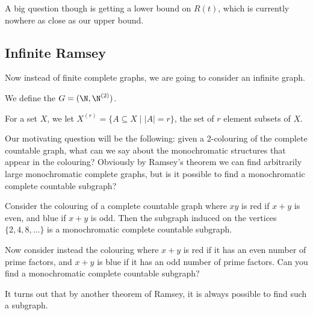 \documentclass[a4paper]{scrartcl}
\begin{document}
A big question though is getting a lower bound on $R(t)$, which is currently nowhere as close as our upper bound.


\subsection{Infinite Ramsey}

Now instead of finite complete graphs, we are going to consider an infinite graph.

\begin{definition}
	We define the  $G = (\N, \N^{(2)})$.
\end{definition}

\begin{notation}
	For a set $X$, we let $X^{(r)} = \{A \subseteq X \mid |A| = r\}$, the set of $r$ element subsets of $X$.
\end{notation}

Our motivating question will be the following: given a 2-colouring of the complete countable graph, what can we say about the monochromatic structures that appear in the colouring? Obviously by Ramsey's theorem we can find arbitrarily large monochromatic complete graphs, but is it possible to find a monochromatic complete countable subgraph?

\begin{example}
	Consider the colouring of a complete countable graph where $xy$ is red if $x + y$ is even, and blue if $x + y$ is odd.
	Then the subgraph induced on the vertices $\{2, 4, 8, \dots\}$ is a monochromatic complete countable subgraph.

	Now consider instead the colouring where $x + y$ is red if it has an even number of prime factors, and $x + y$ is blue if it has an odd number of prime factors. Can you find a monochromatic complete countable subgraph?
\end{example}

It turns out that by another theorem of Ramsey, it is always possible to find such a subgraph.
\end{document}
